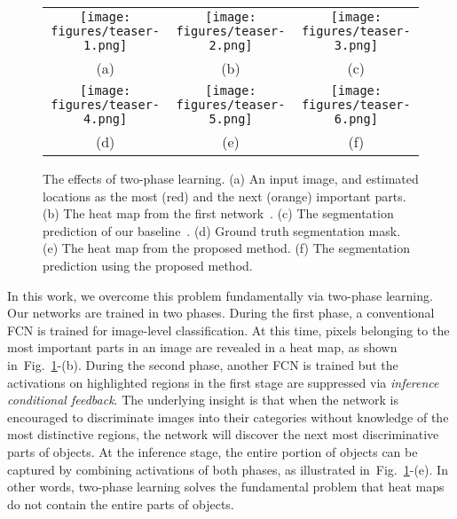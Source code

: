 \documentclass[10pt,twocolumn,letterpaper]{article}
\newcommand{\figref}[1]{Fig.~\ref{#1}}
\begin{document}
\begin{figure}[t]
\def\arraystretch{0.5}
\begin{tabular}{@{}c@{\hskip 0.01\linewidth}c@{\hskip 0.01\linewidth}c@{\hskip 0.01\linewidth}}

\texttt{[image: figures/teaser-1.png]} &
\texttt{[image: figures/teaser-2.png]} &
\texttt{[image: figures/teaser-3.png]}\\{\small (a)} & {\small (b) } & {\small (c) }\\
\texttt{[image: figures/teaser-4.png]} &
\texttt{[image: figures/teaser-5.png]} &
\texttt{[image: figures/teaser-6.png]} \\
{\small (d)} & {\small (e)} & {\small (f)} 
\end{tabular}
\caption{The effects of two-phase learning. (a) An input image, and estimated locations as the most (red) and the next (orange) important parts. (b) The heat map from the first network~\cite{zhou2016cvpr}. (c) The segmentation prediction of our baseline~\cite{kolesnikov2016seed}. (d) Ground truth segmentation mask. (e) The heat map from the proposed method. (f) The segmentation prediction using the proposed method.}
\label{fig:teaser}
\end{figure}


In this work, we overcome this problem fundamentally via two-phase learning. Our networks are trained in two phases. During the first phase, a conventional FCN is trained for image-level classification. At this time, pixels belonging to the most important parts in an image are revealed in a heat map, as shown in~\figref{fig:teaser}-(b).  During the second phase, another FCN is trained but the activations on highlighted regions in the first stage are suppressed via \textit{inference conditional feedback}. %
The underlying insight is that when the network is encouraged to discriminate images into their categories without knowledge of the most distinctive regions, the network will discover the next most discriminative parts of objects. At the inference stage, the entire portion of objects can be captured by combining activations of both phases, as illustrated in~\figref{fig:teaser}-(e). In other words, two-phase learning solves the fundamental problem that heat maps do not contain the entire parts of objects.
\end{document}
